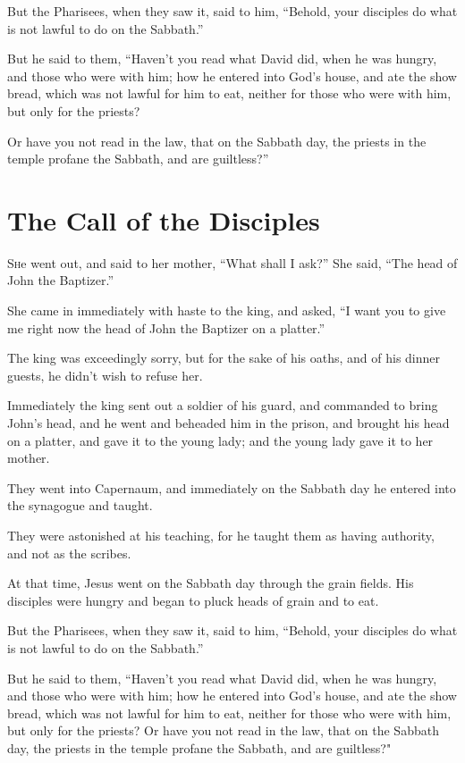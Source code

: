 But the Pharisees, when they saw it, said to him, “Behold, your disciples do what is not lawful to do on the Sabbath.”

But he said to them, “Haven’t you read what David did, when he was hungry, and those who were with him; how he entered into God’s house, and ate the show bread, which was not lawful for him to eat, neither for those who were with him, but only for the priests?

Or have you not read in the law, that on the Sabbath day, the priests in the temple profane the Sabbath, and are guiltless?”

\clearpage \section*{The Call of the Disciples}
\chapterornament

\lettrine{S}he went out, and said to her mother, “What shall I ask?” She said, “The head of John the Baptizer.”

She came in immediately with haste to the king, and asked, “I want you to give me right now the head of John the Baptizer on a platter.”

The king was exceedingly sorry, but for the sake of his oaths, and of his dinner guests, he didn’t wish to refuse her.

Immediately the king sent out a soldier of his guard, and commanded to bring John’s head, and he went and beheaded him in the prison, and brought his head on a platter, and gave it to the young lady; and the young lady gave it to her mother.

They went into Capernaum, and immediately on the Sabbath day he entered into the synagogue and taught.

They were astonished at his teaching, for he taught them as having authority, and not as the scribes.

At that time, Jesus went on the Sabbath day through the grain fields. His disciples were hungry and began to pluck heads of grain and to eat.

But the Pharisees, when they saw it, said to him, “Behold, your disciples do what is not lawful to do on the Sabbath.”

But he said to them, “Haven’t you read what David did, when he was hungry, and those who were with him; how he entered into God’s house, and ate the show bread, which was not lawful for him to eat, neither for those who were with him, but only for the priests? Or have you not read in the law, that on the Sabbath day, the priests in the temple profane the Sabbath, and are guiltless?"

